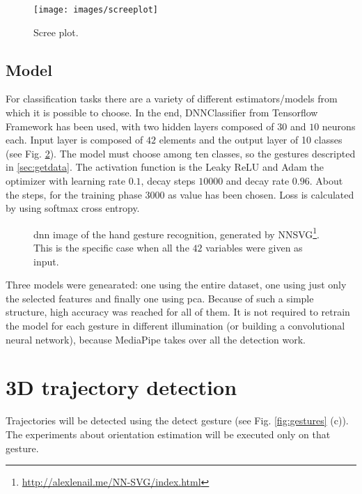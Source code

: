 \begin{figure}[H]
	\centering
	\texttt{[image: images/screeplot]}
	\caption[Scree plot.]{Scree plot.}
	\label{fig:screeplot}
\end{figure}

\subsection{Model}
\label{sec:model}
For classification tasks there are a variety of different estimators/models from which it is possible to choose. In the end, DNNClassifier from Tensorflow Framework has been used, with two hidden layers composed of $30$ and $10$ neurons each. Input layer is composed of $42$ elements and the output layer of 10 classes (see Fig. \ref{fig:handarch}). The model must choose among ten classes, so the gestures descripted in \ref{sec:getdata}. The activation function is the Leaky ReLU and Adam the optimizer with learning rate $0.1$, decay steps $10000$ and decay rate $0.96$. About the steps, for the training phase $3000$ as value has been chosen. Loss is calculated by using softmax cross entropy.


\begin{figure}[H]
	\caption[Hand gesture reconognition \gls{nn}.] {\gls{dnn} image of the hand gesture recognition, generated by NNSVG\footnote{\url{http://alexlenail.me/NN-SVG/index.html}}. This is the specific case when all the $42$ variables were given as input.}
	\label{fig:handarch}
\end{figure}

\noindent Three models were genearated: one using the entire dataset, one using just only the selected features and finally one using \gls{pca}. Because of such a simple structure, high accuracy was reached for all of them. It is not required to retrain the model for each gesture in different illumination (or building a convolutional neural network), because MediaPipe takes over all the detection work.

\section{3D trajectory detection}
\label{sec:3dtraj}
Trajectories will be detected using the detect gesture (see Fig. \ref{fig:gestures} (c)). The experiments about orientation estimation will be executed only on that gesture. 


